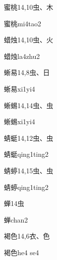 \begin{entry}{蜜桃}{14,10}{⾍、⽊}
  \begin{phonetics}{蜜桃}{mi4tao2}
  \end{phonetics}
\end{entry}

\begin{entry}{蜡烛}{14,10}{⾍、⽕}
  \begin{phonetics}{蜡烛}{la4zhu2}
  \end{phonetics}
\end{entry}

\begin{entry}{蜥易}{14,8}{⾍、⽇}
  \begin{phonetics}{蜥易}{xi1yi4}
  \end{phonetics}
\end{entry}

\begin{entry}{蜥蜴}{14,14}{⾍、⾍}
  \begin{phonetics}{蜥蜴}{xi1yi4}
  \end{phonetics}
\end{entry}

\begin{entry}{蜻蜓}{14,12}{⾍、⾍}
  \begin{phonetics}{蜻蜓}{qing1ting2}
  \end{phonetics}
\end{entry}

\begin{entry}{蜻蝏}{14,15}{⾍、⾍}
  \begin{phonetics}{蜻蝏}{qing1ting2}
  \end{phonetics}
\end{entry}

\begin{entry}{蝉}{14}{⾍}
  \begin{phonetics}{蝉}{chan2}
  \end{phonetics}
\end{entry}

\begin{entry}{褐色}{14,6}{⾐、⾊}
  \begin{phonetics}{褐色}{he4 se4}
  \end{phonetics}
\end{entry}

